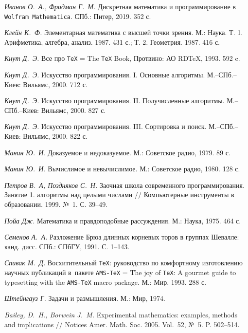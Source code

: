 \documentclass[intlimits,twoside,a4paper,11pt]{article}
\begin{document}
\begin{thebibliography}{99}
{	 {\it Иванов О.~А., Фридман Г.~М.\/} Дискретная математика
	и программирование в {\tt Wolfram Mathematica}. СПб.: Питер,  2019. 352 с.
	
	 {\it Клейн К.~Ф.}
	Элементарная математика с высшей точки зрения. М.: Наука. Т. 1. 
	Арифметика, алгебра, анализ. 1987. 431 с.; Т. 2. Геометрия. 1987. 416 с.
	
	 {\it Кнут Д.~Э.\/} Все про {\tt \TeX} = The {\tt \TeX} Book,
	Протвино: АО RDTeX, 1993. 592 c. 
	
	 {\it Кнут Д.~Э.\/} Искусство программирования. I. Основные алгоритмы. 
	М.--СПб.--Киев: Вильямс,  2000. 712 с.
	
	 {\it Кнут Д.~Э.\/} Искусство программирования. II. Получисленные алгоритмы. 
	М.--СПб.--Киев: Вильямс, 2000. 827 с.
	
	 {\it Кнут Д.~Э.\/} Искусство программирования. III. Сортировка и поиск.
	М.--СПб.--Киев: Вильямс, 2000. 822 с.
	
	 {\it Манин Ю.~И.\/} Доказуемое и недоказуемое. М.: Советское радио, 1979. 89 с.
	
	 {\it Манин Ю.~И.\/} Вычислимое и невычислимое. М.: Советское радио, 1980. 128 с.
	
	 {\it Петров В.~А, Поздняков С.~Н.} Заочная школа современного 
	программирования. Занятие 1. алгоритмы над целыми числами //  Компьютерные
	инструменты в образовании. 1999. №~1. С. 39--49.
	
	 {\it Пойа Дж.} Математика и правдоподобные рассуждения.
	М.: Наука, 1975. 464 с.
	
	 {\it Семенов А.~А.\/} Разложение Брюа длинных корневых торов
	в группах Шевалле: канд. дисс. СПб.: СПбГУ,  1991. С. 1--143.
	
	 {\it Спивак М.~Д.\/} Восхитительный {\tt \TeX}: руководство по
	комфортному изготовлению научных публикаций в~пакете  {\tt AMS-\TeX} =
	The joy of {\tt \TeX}: A gourmet guide to typesetting with the {\tt AMS-\TeX} 
	macro package. М.: Мир, 1993. 288 с.
	
	 {\it Штейнгауз Г. \/} Задачи и размышления. М.: Мир, 1974.
	
	 {\it  Bailey, D.~H., Borwein J.~M.\/} Experimental 
	mathematics: examples, methods and implications // 
	Notices Amer. Math. Soc. 2005. Vol.~52, №~5. P. 502--514. 
	
}
\end{thebibliography}
\end{document}
